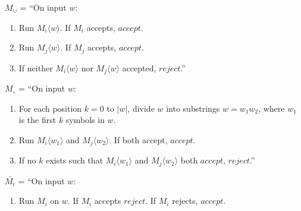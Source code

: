 \documentclass[11pt]{article}
\renewcommand{\indent}{\hspace{1em}}
\begin{document}
\begin{enumerate}[7.1]
    $M_\cup$ = ``On input $w$:
    \begin{enumerate}[\indent1.]
      \item Run $M_i\langle w \rangle$. If $M_i$ accepts, $accept$.
      \item Run $M_j\langle w \rangle$. If $M_j$ accepts, $accept$.
      \item If neither $M_i\langle w \rangle$ nor $M_j\langle w \rangle$ accepted, $reject$.''
    \end{enumerate}
    $M_\circ$ = ``On input $w$:
    \begin{enumerate}[\indent1.]
      \item For each position $k = 0$ to $|w|$, divide $w$ into substrings $w = w_1w_2$, where $w_1$ is the first $k$ symbols in $w$.
      \item \indent Run $M_i\langle w_1 \rangle$ and $M_j\langle w_2 \rangle$. If both accept, $accept$.
      \item If no $k$ exists such that $M_i\langle w_1 \rangle$ and $M_j\langle w_2 \rangle$ both $accept$, $reject$.''
    \end{enumerate}
    $\bar{M_i}$ = ``On input $w$:
    \begin{enumerate}[\indent1.]
      \item Run $M_i$ on $w$. If $M_i$ accepts $reject$. If $M_i$ rejects, $accept$.
    \end{enumerate}
\end{enumerate}
\end{document}
